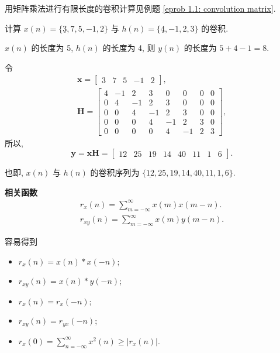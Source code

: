 用矩阵乘法进行有限长度的卷积计算见例题 \ref{eprob 1.1: convolution matrix}.

\begin{exampleprob} \label{eprob 1.1: convolution matrix}
    计算 $x(n)=\{\underline{3},7,5,-1,2\}$ 与 $h(n)=\{\underline{4},-1,2,3\}$ 的卷积.

    \begin{solution}
        $x(n)$ 的长度为 5, $h(n)$ 的长度为 4, 则 $y(n)$ 的长度为 $5+4-1=8$.

        令
        \begin{gather*}
            \mathbf{x}=\begin{bmatrix}
                3 & 7 & 5 & -1 & 2
            \end{bmatrix}, \\
            \mathbf{H}=\begin{bmatrix}
                4 & -1 & 2  & 3  & 0  & 0  & 0 & 0 \\
                0 & 4  & -1 & 2  & 3  & 0  & 0 & 0 \\
                0 & 0  & 4  & -1 & 2  & 3  & 0 & 0 \\
                0 & 0  & 0  & 4  & -1 & 2  & 3 & 0 \\
                0 & 0  & 0  & 0  & 4  & -1 & 2 & 3
            \end{bmatrix},
        \end{gather*}
        所以,
        \begin{equation*}
            \mathbf{y}=\mathbf{xH}=\begin{bmatrix}
                12 & 25 & 19 & 14 & 40 & 11 & 1 & 6
            \end{bmatrix}.
        \end{equation*}

        也即, $x(n)$ 与 $h(n)$ 的卷积序列为 $\{\underline{12},25,19,14,40,11,1,6\}$.
    \end{solution}
\end{exampleprob}

\textbf{相关函数}
\begin{gather}
    r_x(n)=\sum_{m=-\infty}^{\infty}x(m)x(m-n). \\
    r_{xy}(n)=\sum_{m=-\infty}^{\infty}x(m)y(m-n).
\end{gather}

容易得到
\begin{itemize}
    \item $r_x(n)=x(n)*x(-n)$;
    \item $r_{xy}(n)=x(n)*y(-n)$;
    \item $r_x(n)=r_x(-n)$;
    \item $r_{xy}(n)=r_{yx}(-n)$;
    \item $r_x(0)=\displaystyle\sum_{n=-\infty}^{\infty}x^2(n)\geq|r_x(n)|$.
\end{itemize}
